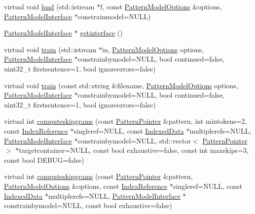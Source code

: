\begin{DoxyCompactItemize}
virtual void \hyperlink{classPatternModel_a84f6c2854b85e6aac9739cdb5807190b}{load} (std\+::istream $\ast$f, const \hyperlink{classPatternModelOptions}{Pattern\+Model\+Options} \&options, \hyperlink{classPatternModelInterface}{Pattern\+Model\+Interface} $\ast$constrainmodel=N\+U\+L\+L)
\item 
\hyperlink{classPatternModelInterface}{Pattern\+Model\+Interface} $\ast$ \hyperlink{classPatternModel_a21f827196f0475305ce3172220a63954}{getinterface} ()
\item 
virtual void \hyperlink{classPatternModel_a0631a4a6c003e4aa18ec82ad4748ef76}{train} (std\+::istream $\ast$in, \hyperlink{classPatternModelOptions}{Pattern\+Model\+Options} options, \hyperlink{classPatternModelInterface}{Pattern\+Model\+Interface} $\ast$constrainbymodel=N\+U\+L\+L, bool continued=false, uint32\+\_\+t firstsentence=1, bool ignoreerrors=false)
\item 
virtual void \hyperlink{classPatternModel_a143ea1e2907a1efd0550f52a51e55539}{train} (const std\+::string \&filename, \hyperlink{classPatternModelOptions}{Pattern\+Model\+Options} options, \hyperlink{classPatternModelInterface}{Pattern\+Model\+Interface} $\ast$constrainbymodel=N\+U\+L\+L, bool continued=false, uint32\+\_\+t firstsentence=1, bool ignoreerrors=false)
\item 
virtual int \hyperlink{classPatternModel_acba7487b306d552d62bfd1ee45c8b504}{computeskipgrams} (const \hyperlink{classPatternPointer}{Pattern\+Pointer} \&pattern, int mintokens=2, const \hyperlink{classIndexReference}{Index\+Reference} $\ast$singleref=N\+U\+L\+L, const \hyperlink{classIndexedData}{Indexed\+Data} $\ast$multiplerefs=N\+U\+L\+L, \hyperlink{classPatternModelInterface}{Pattern\+Model\+Interface} $\ast$constrainbymodel=N\+U\+L\+L, std\+::vector$<$ \hyperlink{classPatternPointer}{Pattern\+Pointer} $>$ $\ast$targetcontainer=N\+U\+L\+L, const bool exhaustive=false, const int maxskips=3, const bool D\+E\+B\+U\+G=false)
\item 
virtual int \hyperlink{classPatternModel_ad9d08c290da84543b324d36ac76efeeb}{computeskipgrams} (const \hyperlink{classPatternPointer}{Pattern\+Pointer} \&pattern, \hyperlink{classPatternModelOptions}{Pattern\+Model\+Options} \&options, const \hyperlink{classIndexReference}{Index\+Reference} $\ast$singleref=N\+U\+L\+L, const \hyperlink{classIndexedData}{Indexed\+Data} $\ast$multiplerefs=N\+U\+L\+L, \hyperlink{classPatternModelInterface}{Pattern\+Model\+Interface} $\ast$constrainbymodel=N\+U\+L\+L, const bool exhaustive=false)
\item 

\end{DoxyCompactItemize}
